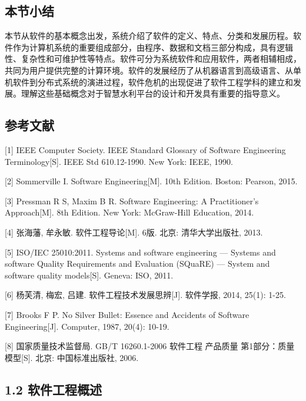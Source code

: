 \hypertarget{ux672cux8282ux5c0fux7ed3}{%
\subsection{本节小结}\label{ux672cux8282ux5c0fux7ed3}}

本节从软件的基本概念出发，系统介绍了软件的定义、特点、分类和发展历程。软件作为计算机系统的重要组成部分，由程序、数据和文档三部分构成，具有逻辑性、复杂性和可维护性等特点。软件可分为系统软件和应用软件，两者相辅相成，共同为用户提供完整的计算环境。软件的发展经历了从机器语言到高级语言、从单机软件到分布式系统的演进过程，软件危机的出现促进了软件工程学科的建立和发展。理解这些基础概念对于智慧水利平台的设计和开发具有重要的指导意义。

\hypertarget{ux53c2ux8003ux6587ux732e}{%
\subsection{参考文献}\label{ux53c2ux8003ux6587ux732e}}

{[}1{]} IEEE Computer Society. IEEE Standard Glossary of Software Engineering Terminology{[}S{]}. IEEE Std 610.12-1990. New York: IEEE, 1990.

{[}2{]} Sommerville I. Software Engineering{[}M{]}. 10th Edition. Boston: Pearson, 2015.

{[}3{]} Pressman R S, Maxim B R. Software Engineering: A Practitioner's Approach{[}M{]}. 8th Edition. New York: McGraw-Hill Education, 2014.

{[}4{]} 张海藩, 牟永敏. 软件工程导论{[}M{]}. 6版. 北京: 清华大学出版社, 2013.

{[}5{]} ISO/IEC 25010:2011. Systems and software engineering --- Systems and software Quality Requirements and Evaluation (SQuaRE) --- System and software quality models{[}S{]}. Geneva: ISO, 2011.

{[}6{]} 杨芙清, 梅宏, 吕建. 软件工程技术发展思辨{[}J{]}. 软件学报, 2014, 25(1): 1-25.

{[}7{]} Brooks F P. No Silver Bullet: Essence and Accidents of Software Engineering{[}J{]}. Computer, 1987, 20(4): 10-19.

{[}8{]} 国家质量技术监督局. GB/T 16260.1-2006 软件工程 产品质量 第1部分：质量模型{[}S{]}. 北京: 中国标准出版社, 2006.

\hypertarget{ux8f6fux4ef6ux5de5ux7a0bux6982ux8ff0}{%
\subsection{1.2 软件工程概述}\label{ux8f6fux4ef6ux5de5ux7a0bux6982ux8ff0}}


